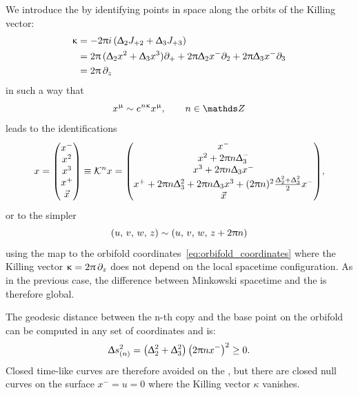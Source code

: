 We introduce the \gnbo by identifying points in space along the orbits of the Killing vector:
\begin{equation}
  \begin{split}
    \upkappa & = - 2 \uppi i\, ( \Updelta_2 J_{+2} + \Updelta_3 J_{+3} )
    \\
           & = 2 \uppi\, ( \Updelta_2 x^2 + \Updelta_3 x^3 ) \partial_{+}
             + 2 \uppi \Updelta_2 x^- \partial_{2} 
             + 2 \uppi \Updelta_3 x^- \partial_{3}
    \\
           & = 2 \uppi\, \partial_{z}
  \end{split}
\label{eq:gnbo_killing_vector}
\end{equation}
in such a way that
\begin{equation}
  x^{\mu} \sim e^{n\kappa} x^{\mu}, \qquad n \in \Z
\end{equation}
leads to the identifications
\begin{equation}
  x
  =
  \mqty( x^- \\ x^2 \\ x^3 \\ x^+ \\ \vec{x} )
  \equiv
  \cK^{n} x
  =
  \mqty(%
    x^-
    \\
    x^2 + 2 \pi n \Delta_3^-
    \\
    x^3 + 2 \pi n \Delta_3x^-
    \\
    x^+ + 2 \pi n \Delta_3^2
    + 2 \pi n \Delta_3x^3
    + (2 \pi n)^2 \frac{\Delta_2^2+\Delta_3^2}{2} x^-
    \\
    \vec{x}
  ),
\end{equation}
or to the simpler
\begin{equation}
  \qty( u,\, v,\, w,\, z ) \sim \qty( u,\, v,\, w,\, z + 2 \uppi n )
\label{eq:orbifold_identifications}
\end{equation}
using the map to the orbifold coordinates~\eqref{eq:orbifold_coordinates} where the Killing vector $\upkappa = 2 \uppi\, \partial_{z}$ does not depend on the local spacetime configuration.
As in the previous case, the difference between Minkowski spacetime and the \gnbo is therefore global.

The geodesic distance between the n-th copy and the base point on the orbifold can be computed in any set of coordinates and is:
\begin{equation}
  \Updelta s^2_{(n)}
  =
  \qty( \Updelta_2^2 + \Updelta_3^2 )\,
  \qty( 2 \uppi n x^- )^2
  \ge 0.
\end{equation}
Closed time-like curves are therefore avoided on the \gnbo, but there are closed null curves on the surface $x^- = u = 0$ where the Killing vector $\kappa$ vanishes.



